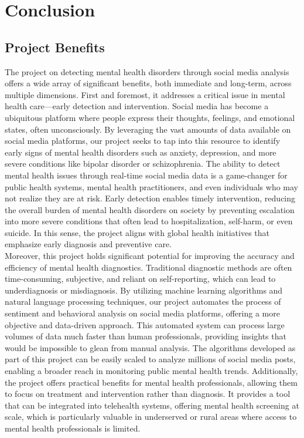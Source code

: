 
\section{Conclusion}

\subsection{Project Benefits}
\noindent
The project on detecting mental health disorders through social media analysis offers a wide array of significant benefits, both immediate and long-term, across multiple dimensions. First and foremost, it addresses a critical issue in mental health care—early detection and intervention. Social media has become a ubiquitous platform where people express their thoughts, feelings, and emotional states, often unconsciously. By leveraging the vast amounts of data available on social media platforms, our project seeks to tap into this resource to identify early signs of mental health disorders such as anxiety, depression, and more severe conditions like bipolar disorder or schizophrenia. The ability to detect mental health issues through real-time social media data is a game-changer for public health systems, mental health practitioners, and even individuals who may not realize they are at risk. Early detection enables timely intervention, reducing the overall burden of mental health disorders on society by preventing escalation into more severe conditions that often lead to hospitalization, self-harm, or even suicide. In this sense, the project aligns with global health initiatives that emphasize early diagnosis and preventive care. \\

\noindent
Moreover, this project holds significant potential for improving the accuracy and efficiency of mental health diagnostics. Traditional diagnostic methods are often time-consuming, subjective, and reliant on self-reporting, which can lead to underdiagnosis or misdiagnosis. By utilizing machine learning algorithms and natural language processing techniques, our project automates the process of sentiment and behavioral analysis on social media platforms, offering a more objective and data-driven approach. This automated system can process large volumes of data much faster than human professionals, providing insights that would be impossible to glean from manual analysis. The algorithms developed as part of this project can be easily scaled to analyze millions of social media posts, enabling a broader reach in monitoring public mental health trends. Additionally, the project offers practical benefits for mental health professionals, allowing them to focus on treatment and intervention rather than diagnosis. It provides a tool that can be integrated into telehealth systems, offering mental health screening at scale, which is particularly valuable in underserved or rural areas where access to mental health professionals is limited. \\

